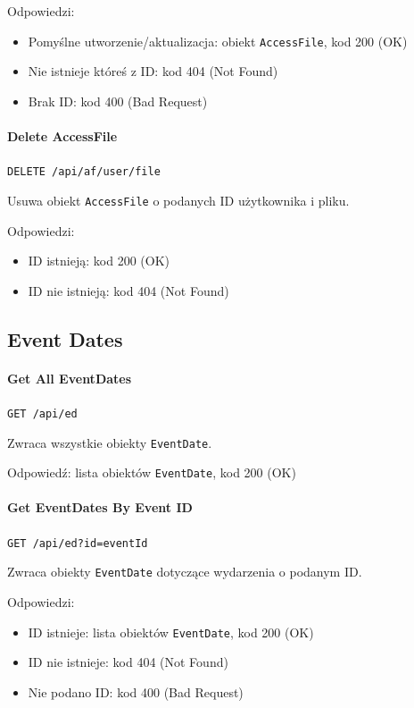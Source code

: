 \documentclass[a4paper,twoside,12pt]{book}
\begin{document}
Odpowiedzi: 
\begin{itemize}
	\item Pomyślne utworzenie/aktualizacja: obiekt \texttt{AccessFile}, kod 200 (OK) 
	\item Nie istnieje któreś z ID: kod 404 (Not Found) 
	\item Brak ID: kod 400 (Bad Request)
\end{itemize}

\paragraph{Delete AccessFile}

\texttt{DELETE /api/af/{user}/{file}}

Usuwa obiekt \texttt{AccessFile} o podanych ID użytkownika i pliku.

Odpowiedzi: 
\begin{itemize}
	\item ID istnieją: kod 200 (OK) 
	\item ID nie istnieją: kod 404 (Not Found)
\end{itemize}

\subsection{Event Dates}

\paragraph{Get All EventDates}

\texttt{GET /api/ed}

Zwraca wszystkie obiekty \texttt{EventDate}.

Odpowiedź: lista obiektów \texttt{EventDate}, kod 200 (OK)

\paragraph{Get EventDates By Event ID}

\texttt{GET /api/ed?id={eventId}}

Zwraca obiekty \texttt{EventDate} dotyczące wydarzenia o podanym ID.

Odpowiedzi: 
\begin{itemize}
	\item ID istnieje: lista obiektów \texttt{EventDate}, kod 200 (OK) 
	\item ID nie istnieje: kod 404 (Not Found) 
	\item Nie podano ID: kod 400 (Bad Request)
\end{itemize}
\end{document}
